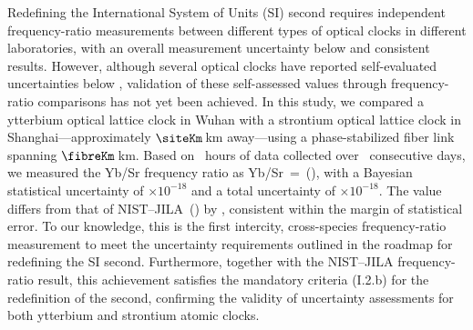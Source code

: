Redefining the International System of Units (SI) second requires
independent frequency-ratio measurements between different types of
optical clocks in different laboratories, with an overall measurement
uncertainty below  and consistent results. However,
although several optical clocks have reported self-evaluated
uncertainties below \selfEvalBound, validation of these self-assessed
values through frequency-ratio comparisons has not yet been achieved. In
this study, we compared a ytterbium optical lattice clock in Wuhan with
a strontium optical lattice clock in Shanghai---approximately
$\siteKm$\,km away---using a phase-stabilized fiber link spanning
$\fibreKm$\,km. Based on \nHours~hours of data collected over
\nDays~consecutive days, we measured the Yb/Sr frequency ratio as
Yb/Sr~=~\Rheadline(\RheadlineUnc), with a Bayesian statistical
uncertainty of \uStatShort$\times10^{-18}$ and a total uncertainty of
\uTotalShort$\times10^{-18}$. The value differs from that of
NIST--JILA~() by \dVsNistE{}, consistent within the
margin of statistical error. To our knowledge, this is the first
intercity, cross-species frequency-ratio measurement to meet the
uncertainty requirements outlined in the roadmap for redefining the SI
second. Furthermore, together with the NIST--JILA frequency-ratio
result, this achievement satisfies the mandatory criteria (I.2.b) for
the redefinition of the second, confirming the validity of uncertainty
assessments for both ytterbium and strontium atomic clocks.
